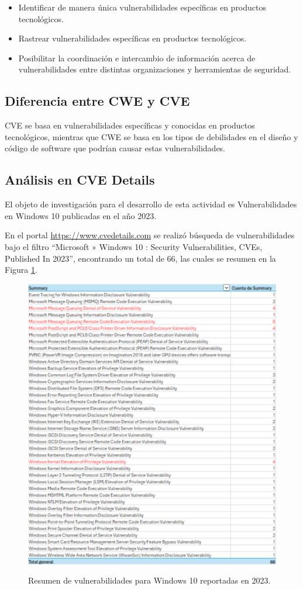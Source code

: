 \documentclass[stu, 11pt, letterpaper, donotrepeattitle, floatsintext, natbib]{apa7}
\begin{document}
\begin{itemize}
\item Identificar de manera única vulnerabilidades específicas en productos tecnológicos.
\item Rastrear vulnerabilidades específicas en productos tecnológicos.
\item Posibilitar la coordinación e intercambio de información acerca de vulnerabilidades entre distintas organizaciones y herramientas de seguridad.
\end{itemize}

\subsection{Diferencia entre CWE y CVE} 

CVE se basa en vulnerabilidades específicas y conocidas en productos tecnológicos, mientras que CWE se basa en los tipos de debilidades en el diseño y código de software que podrían causar estas vulnerabilidades.

\subsection{Análisis en CVE Details} 

El objeto de investigación para el desarrollo de esta actividad es Vulnerabilidades en Windows 10 publicadas en el año 2023.

En el portal \url{https://www.cvedetails.com} se realizó búsqueda de vulnerabilidades bajo el filtro “Microsoft » Windows 10 : Security Vulnerabilities, CVEs, Published In 2023”, encontrando un total de 66, las cuales se resumen en la Figura \ref{tabla1}.

\begin{figure}[H]
    \centering
    \caption{Resumen de vulnerabilidades para Windows 10 reportadas en 2023.}
    \includegraphics[width=0.4\linewidth]{ac11.png} %
    \label{tabla1}
\end{figure}
\end{document}
